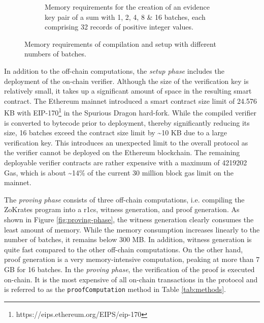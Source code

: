 \begin{figure}[h]
\begin{subfigure}[t]{0.49\textwidth}
        \caption{Memory requirements for the creation of an evidence key pair of a sum with 1, 2, 4, 8 \& 16 batches, each comprising 32 records of positive integer values.}
        \label{fig:setup-graph}
    \end{subfigure}
    \caption{Memory requirements of compilation and setup with different numbers of batches.}
    \label{fig:setup-phase}
\end{figure}

In addition to the off-chain computations, the \emph{setup phase} includes the deployment of the on-chain verifier. Although the size of the verification key is relatively small, it takes up a significant amount of space in the resulting smart contract. The Ethereum mainnet introduced a smart contract size limit of 24.576 KB with EIP-170\footnote{https://eips.ethereum.org/EIPS/eip-170} in the Spurious Dragon hard-fork. While the compiled verifier is converted to bytecode prior to deployment, thereby significantly reducing its size, 16 batches exceed the contract size limit by \textasciitilde 10 KB due to a large verification key. This introduces an unexpected limit to the overall protocol as the verifier cannot be deployed on the Ethereum blockchain. The remaining deployable verifier contracts are rather expensive with a maximum of 4219202 Gas, which is about \textasciitilde 14\% of the current 30 million block gas limit on the mainnet.

The \emph{proving phase} consists of three off-chain computations, i.e. compiling the ZoKrates program into a \acrshort{r1cs}, witness generation, and proof generation. As shown in Figure \ref{fig:proving-phase}, the witness generation clearly consumes the least amount of memory. While the memory consumption increases linearly to the number of batches, it remains below 300 MB. In addition, witness generation is quite fast compared to the other off-chain computations. On the other hand, proof generation is a very memory-intensive computation, peaking at more than 7 GB for 16 batches. In the \emph{proving phase}, the verification of the proof is executed on-chain. It is the most expensive of all on-chain transactions in the protocol and is referred to as the \texttt{proofComputation} method in Table \ref{tab:methods}.


